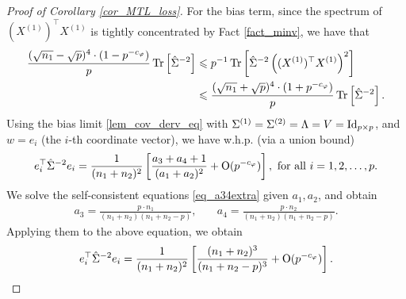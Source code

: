 \begin{proof}[Proof of Corollary \ref{cor_MTL_loss}]
For the bias term, since the spectrum of $(X^{(1)})^{\top} X^{(1)}$ is tightly concentrated by Fact \ref{fact_minv}, we have that
\begin{align}
 \frac{(\sqrt{n_1}-\sqrt{p})^4 \cdot (1- p^{-c_\varphi})}{p} \operatorname{Tr}\left[\hat \Sigma^{-2}\right]  &\leqslant {p}^{-1}\operatorname{Tr}\left[\hat\Sigma^{-2} \left((X^{(1)})^\top X^{(1)} \right)^2\right] \label{eq_bias111}\\
 &\leqslant \frac{(\sqrt{n_1}+\sqrt{p})^4 \cdot (1+ p^{-c_\varphi})}{p} \operatorname{Tr}\left[\hat\Sigma^{-2}\right].\nonumber
\end{align}
Using the bias limit \eqref{lem_cov_derv_eq} with $\Sigma^{(1)}=\Sigma^{(2)}=\Lambda=V=\operatorname{Id}_{p\times p}$, and $w = e_i$ (the $i$-th coordinate vector), we have w.h.p. (via a union bound)
\begin{align*}%
 e_i^{\top}\hat\Sigma^{-2} e_i = \frac{1}{(n_1+n_2)^2} \left[\frac{a_3+a_4+1}{(a_1+a_2)^2} +\OO(p^{-c_\varphi})\right], \text{ for all } i = 1, 2, \dots, p.
\end{align*}
We solve the self-consistent equations \eqref{eq_a34extra} given $a_1, a_2$, and obtain
\begin{align*}
		a_3 = \frac{p\cdot n_1}{(n_1 +n_2)(n_1 +n_2 - p)}, \quad
		&  a_4 = \frac{p\cdot n_2}{(n_1 + n_2)(n_1 + n_2 - p)}. %
\end{align*}
Applying them to the above equation, we obtain
\begin{align*}%
 e_i^{\top}\hat\Sigma^{-2}e_i =  \frac{1}{(n_1+n_2)^2} \left[  \frac{ (n_1+n_2)^3 }{(n_1+n_2-p)^3} +\OO(p^{-c_\varphi})\right].
\end{align*}

\end{proof}
